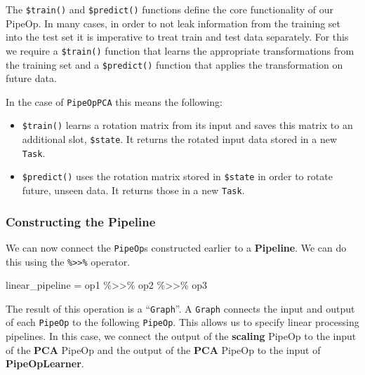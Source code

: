 \documentclass[
]{scrbook}
\newenvironment{Shaded}{\begin{snugshade}}{\end{snugshade}}
\newcommand{\NormalTok}[1]{#1}
\newcommand{\OtherTok}[1]{\textcolor[rgb]{0.56,0.35,0.01}{#1}}
\newcommand{\SpecialCharTok}[1]{\textcolor[rgb]{0.00,0.00,0.00}{#1}}
\providecommand{\tightlist}{%
  \setlength{\itemsep}{0pt}\setlength{\parskip}{0pt}}
\renewenvironment{Shaded} {\begin{snugshade}\small} {\end{snugshade}}
\begin{document}
The \texttt{\$train()} and \texttt{\$predict()} functions define the core functionality of our PipeOp.
In many cases, in order to not leak information from the training set into the test set it is imperative to treat train and test data separately.
For this we require a \texttt{\$train()} function that learns the appropriate transformations from the training set and a \texttt{\$predict()} function that applies the transformation on future data.

In the case of \texttt{PipeOpPCA} this means the following:

\begin{itemize}
\tightlist
\item
  \texttt{\$train()} learns a rotation matrix from its input and saves this matrix to an additional slot, \texttt{\$state}.
  It returns the rotated input data stored in a new \texttt{Task}.
\item
  \texttt{\$predict()} uses the rotation matrix stored in \texttt{\$state} in order to rotate future, unseen data.
  It returns those in a new \texttt{Task}.
\end{itemize}

\hypertarget{constructing-the-pipeline}{%
\subsubsection{Constructing the Pipeline}\label{constructing-the-pipeline}}

We can now connect the \texttt{PipeOp}s constructed earlier to a \textbf{Pipeline}.
We can do this using the \texttt{\%\textgreater{}\textgreater{}\%} operator.

\begin{Shaded}
\begin{Highlighting}[]
\NormalTok{linear\_pipeline }\OtherTok{=}\NormalTok{ op1 }\SpecialCharTok{\%\textgreater{}\textgreater{}\%}\NormalTok{ op2 }\SpecialCharTok{\%\textgreater{}\textgreater{}\%}\NormalTok{ op3}
\end{Highlighting}
\end{Shaded}

The result of this operation is a ``\texttt{Graph}''.
A \texttt{Graph} connects the input and output of each \texttt{PipeOp} to the following \texttt{PipeOp}.
This allows us to specify linear processing pipelines.
In this case, we connect the output of the \textbf{scaling} PipeOp to the input of the \textbf{PCA} PipeOp and the output of the \textbf{PCA} PipeOp to the input of \textbf{PipeOpLearner}.
\end{document}
